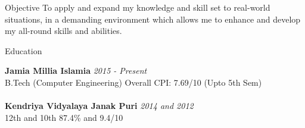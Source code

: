 \documentclass{resume} %
\begin{document}


\begin{rSection}{Objective}
To apply and expand my knowledge and skill set to real-world situations, in a demanding environment which allows me to enhance and develop my all-round skills and abilities.
\end{rSection}


\begin{rSection}{Education}

{\bf Jamia Millia Islamia} \hfill {\em 2015 - Present} 
\\ B.Tech (Computer Engineering) \hfill { Overall CPI: 7.69/10 (Upto 5th Sem)} 
\\
\\{\bf Kendriya Vidyalaya Janak Puri} \hfill {\em 2014 and 2012} \\
12th and 10th \hfill {87.4\% and 9.4/10}


\end{rSection}
\end{document}
